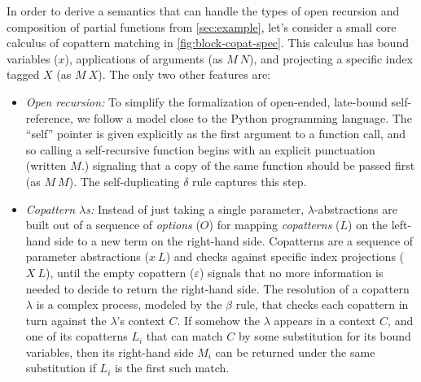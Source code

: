 \documentclass[sigplan,screen]{acmart}
\begin{document}
In order to derive a semantics that can handle the types of open recursion and
composition of partial functions from \cref{sec:example}, let's consider a small
core calculus of copattern matching in \cref{fig:block-copat-spec}.  This
calculus has bound variables ($x$), applications of arguments (as $M~N$), and
projecting a specific index tagged $X$ (as $M~X$).  The only two other features
are:
\begin{itemize}
\item \emph{Open recursion:} To simplify the formalization of open-ended,
  late-bound self-reference, we follow a model close to the Python programming
  language.  The ``self'' pointer is given explicitly as the first argument to a
  function call, and so calling a self-recursive function begins with an
  explicit punctuation (written $M.$) signaling that a copy of the same function
  should be passed first (as $M~M$).  The self-duplicating $\delta$ rule
  captures this step.
\item \emph{Copattern $\lambda$s:} Instead of just taking a single parameter,
  $\lambda$-abstractions are built out of a sequence of \emph{options} ($O$) for
  mapping \emph{copatterns} ($L$) on the left-hand side to a new term on the
  right-hand side.  Copatterns are a sequence of parameter abstractions ($x~L$)
  and checks against specific index projections ($X~L$), until the empty
  copattern ($\varepsilon$) signals that no more information is needed to decide
  to return the right-hand side.  The resolution of a copattern $\lambda$ is a
  complex process, modeled by the $\beta$ rule, that checks each copattern in
  turn against the $\lambda$'s context $C$.  If somehow the $\lambda$ appears in
  a context $C$, and one of its copatterns $L_i$ that can match $C$ by some
  substitution for its bound variables, then its right-hand side $M_i$ can be
  returned under the same substitution if $L_i$ is the first such match.
\end{itemize}
\end{document}
